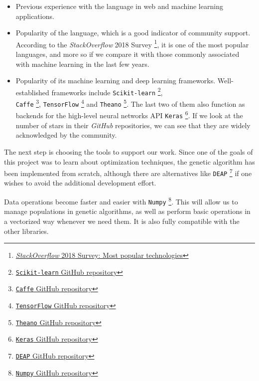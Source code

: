 		\begin{itemize}

			\item
			Previous experience with the language in web and machine learning applications.

			\item
			Popularity of the language, which is a good indicator of community support. According to the \textit{StackOverflow} 2018 Survey \footnote{\href{https://insights.stackoverflow.com/survey/2018/\#technology-programming-scripting-and-markup-languages}{\textit{StackOverflow} 2018 Survey: Most popular technologies}}, it is one of the most popular languages, and more so if we compare it with those commonly associated with machine learning in the last few years.

			\item
			Popularity of its machine learning and deep learning frameworks. Well-established frameworks include \texttt{Scikit-learn} \footnote{\href{https://github.com/scikit-learn/scikit-learn}{\texttt{Scikit-learn} GitHub repository}}, \\ \texttt{Caffe} \footnote{\href{https://github.com/BVLC/caffe}{\texttt{Caffe} GitHub repository}}, \texttt{TensorFlow} \footnote{\href{https://github.com/tensorflow/tensorflow}{\texttt{TensorFlow} GitHub repository}} and \texttt{Theano} \footnote{\href{https://github.com/Theano/Theano}{\texttt{Theano} GitHub repository}}. The last two of them also function as backends for the high-level neural networks API \texttt{Keras} \footnote{\href{https://github.com/keras-team/keras}{\texttt{Keras} GitHub repository}}. If we look at the number of stars in their \textit{GitHub} repositories, we can see that they are widely acknowledged by the community.

		\end{itemize}

\newpage

		The next step is choosing the tools to support our work. Since one of the goals of this project was to learn about optimization techniques, the genetic algorithm has been implemented from scratch, although there are alternatives like \texttt{DEAP} \footnote{\href{https://github.com/DEAP/deap}{\texttt{DEAP} GitHub repository}} if one wishes to avoid the additional development effort.

		Data operations become faster and easier with \texttt{Numpy} \footnote{\href{https://github.com/numpy/numpy}{\texttt{Numpy} GitHub repository}}. This will allow us to manage populations in genetic algorithms, as well as perform basic operations in a vectorized way whenever we need them. It is also fully compatible with the other libraries.


